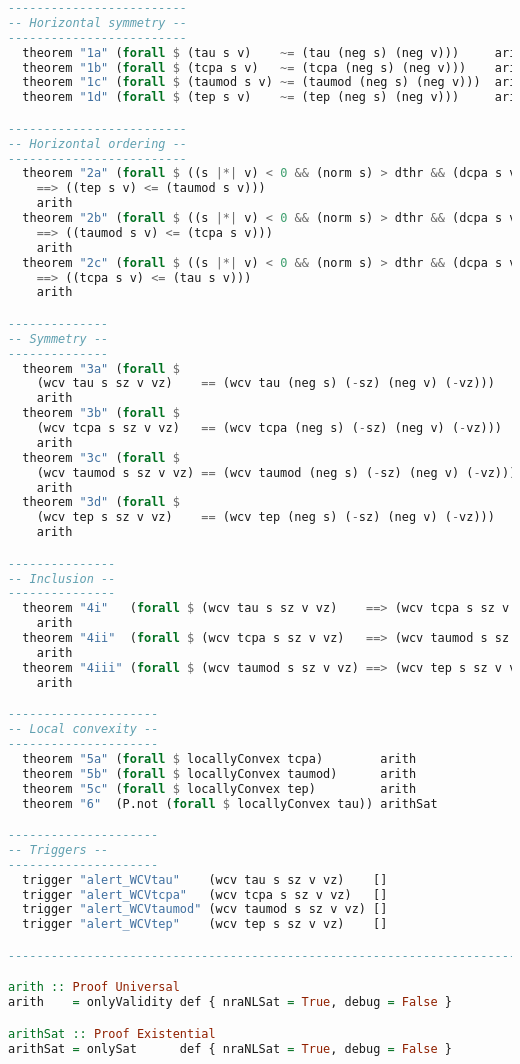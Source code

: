 {\begin{lstlisting}[language=Haskell]
-------------------------
-- Horizontal symmetry --
-------------------------
  theorem "1a" (forall $ (tau s v)    ~= (tau (neg s) (neg v)))     arith
  theorem "1b" (forall $ (tcpa s v)   ~= (tcpa (neg s) (neg v)))    arith
  theorem "1c" (forall $ (taumod s v) ~= (taumod (neg s) (neg v)))  arith
  theorem "1d" (forall $ (tep s v)    ~= (tep (neg s) (neg v)))     arith

-------------------------
-- Horizontal ordering --
-------------------------
  theorem "2a" (forall $ ((s |*| v) < 0 && (norm s) > dthr && (dcpa s v) <= dthr)
    ==> ((tep s v) <= (taumod s v)))
    arith
  theorem "2b" (forall $ ((s |*| v) < 0 && (norm s) > dthr && (dcpa s v) <= dthr)
    ==> ((taumod s v) <= (tcpa s v)))
    arith
  theorem "2c" (forall $ ((s |*| v) < 0 && (norm s) > dthr && (dcpa s v) <= dthr)
    ==> ((tcpa s v) <= (tau s v)))
    arith

--------------
-- Symmetry --
--------------
  theorem "3a" (forall $
    (wcv tau s sz v vz)    == (wcv tau (neg s) (-sz) (neg v) (-vz)))
    arith
  theorem "3b" (forall $
    (wcv tcpa s sz v vz)   == (wcv tcpa (neg s) (-sz) (neg v) (-vz)))
    arith
  theorem "3c" (forall $
    (wcv taumod s sz v vz) == (wcv taumod (neg s) (-sz) (neg v) (-vz)))
    arith
  theorem "3d" (forall $
    (wcv tep s sz v vz)    == (wcv tep (neg s) (-sz) (neg v) (-vz)))
    arith

---------------
-- Inclusion --
---------------
  theorem "4i"   (forall $ (wcv tau s sz v vz)    ==> (wcv tcpa s sz v vz))
    arith
  theorem "4ii"  (forall $ (wcv tcpa s sz v vz)   ==> (wcv taumod s sz v vz ))
    arith
  theorem "4iii" (forall $ (wcv taumod s sz v vz) ==> (wcv tep s sz v vz))
    arith

---------------------
-- Local convexity --
---------------------
  theorem "5a" (forall $ locallyConvex tcpa)        arith
  theorem "5b" (forall $ locallyConvex taumod)      arith
  theorem "5c" (forall $ locallyConvex tep)         arith
  theorem "6"  (P.not (forall $ locallyConvex tau)) arithSat

---------------------
-- Triggers --
---------------------
  trigger "alert_WCVtau"    (wcv tau s sz v vz)    []
  trigger "alert_WCVtcpa"   (wcv tcpa s sz v vz)   []
  trigger "alert_WCVtaumod" (wcv taumod s sz v vz) []
  trigger "alert_WCVtep"    (wcv tep s sz v vz)    []

----------------------------------------------------------------------------

arith :: Proof Universal
arith    = onlyValidity def { nraNLSat = True, debug = False }

arithSat :: Proof Existential
arithSat = onlySat      def { nraNLSat = True, debug = False }

\end{lstlisting}
}

